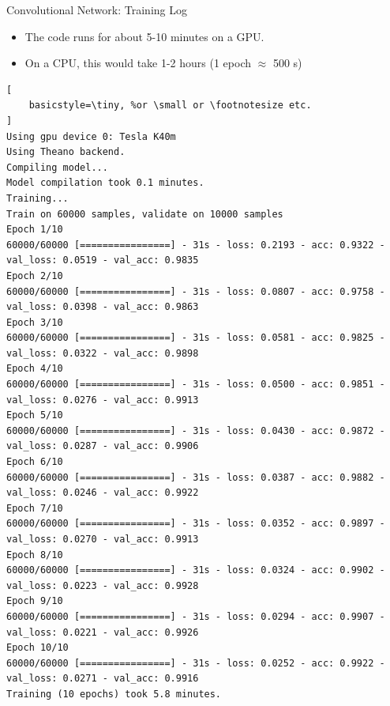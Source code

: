 \documentclass[10pt, aspectratio=169]{beamer} %
\begin{document}
\begin{frame}[fragile]{Convolutional Network: Training Log}
\begin{itemize}
	\item The code runs for about 5-10 minutes on a GPU.
	\item On a CPU, this would take 1-2 hours (1 epoch $\approx$ 500 s)
\end{itemize}
\begin{lstlisting}[
    basicstyle=\tiny, %or \small or \footnotesize etc.
]
Using gpu device 0: Tesla K40m 
Using Theano backend.
Compiling model...
Model compilation took 0.1 minutes.
Training...
Train on 60000 samples, validate on 10000 samples
Epoch 1/10
60000/60000 [================] - 31s - loss: 0.2193 - acc: 0.9322 - val_loss: 0.0519 - val_acc: 0.9835
Epoch 2/10
60000/60000 [================] - 31s - loss: 0.0807 - acc: 0.9758 - val_loss: 0.0398 - val_acc: 0.9863
Epoch 3/10
60000/60000 [================] - 31s - loss: 0.0581 - acc: 0.9825 - val_loss: 0.0322 - val_acc: 0.9898
Epoch 4/10
60000/60000 [================] - 31s - loss: 0.0500 - acc: 0.9851 - val_loss: 0.0276 - val_acc: 0.9913
Epoch 5/10
60000/60000 [================] - 31s - loss: 0.0430 - acc: 0.9872 - val_loss: 0.0287 - val_acc: 0.9906
Epoch 6/10
60000/60000 [================] - 31s - loss: 0.0387 - acc: 0.9882 - val_loss: 0.0246 - val_acc: 0.9922
Epoch 7/10
60000/60000 [================] - 31s - loss: 0.0352 - acc: 0.9897 - val_loss: 0.0270 - val_acc: 0.9913
Epoch 8/10
60000/60000 [================] - 31s - loss: 0.0324 - acc: 0.9902 - val_loss: 0.0223 - val_acc: 0.9928
Epoch 9/10
60000/60000 [================] - 31s - loss: 0.0294 - acc: 0.9907 - val_loss: 0.0221 - val_acc: 0.9926
Epoch 10/10
60000/60000 [================] - 31s - loss: 0.0252 - acc: 0.9922 - val_loss: 0.0271 - val_acc: 0.9916
Training (10 epochs) took 5.8 minutes.
\end{lstlisting}
\end{frame}
\end{document}
